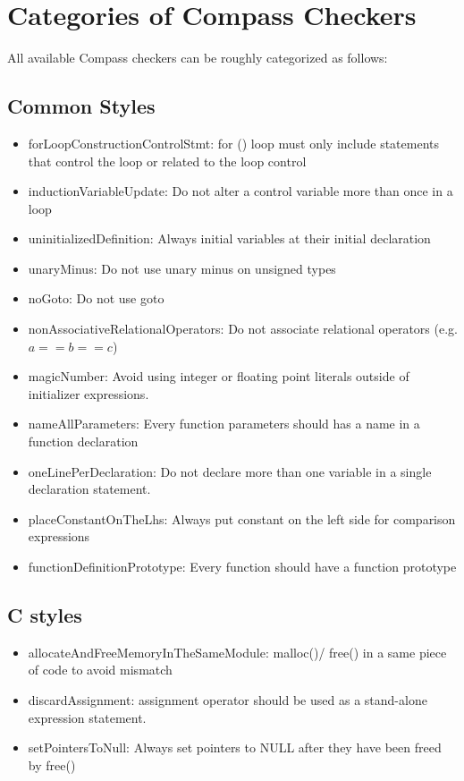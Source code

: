 \chapter{Categories of Compass Checkers}
All available Compass checkers can be roughly categorized as follows:

\section{Common Styles}
\begin{itemize}
\item forLoopConstructionControlStmt: for () loop must only include statements that control the loop or related to the loop control
\item inductionVariableUpdate: Do not alter a control variable more than once in a loop
\item uninitializedDefinition: Always initial variables at their initial declaration
\item unaryMinus: Do not use unary minus on unsigned types
\item noGoto: Do not use goto
\item nonAssociativeRelationalOperators: Do not associate relational
operators (e.g. $a==b==c$)
\item magicNumber: Avoid using integer or floating point literals outside of initializer expressions.
\item nameAllParameters: Every function parameters should has a name in a function declaration
\item oneLinePerDeclaration: Do not declare more than one variable in a single declaration statement. 
\item placeConstantOnTheLhs: Always put constant on the left side for comparison expressions
\item functionDefinitionPrototype: Every function should have a function prototype
\end{itemize}

\section{C styles}
\begin{itemize}
\item allocateAndFreeMemoryInTheSameModule: malloc()/ free() in a same piece of code to avoid mismatch
\item discardAssignment: assignment operator should be used as a stand-alone expression statement.
\item setPointersToNull: Always set pointers to NULL after they have been freed by free()
\end{itemize}

